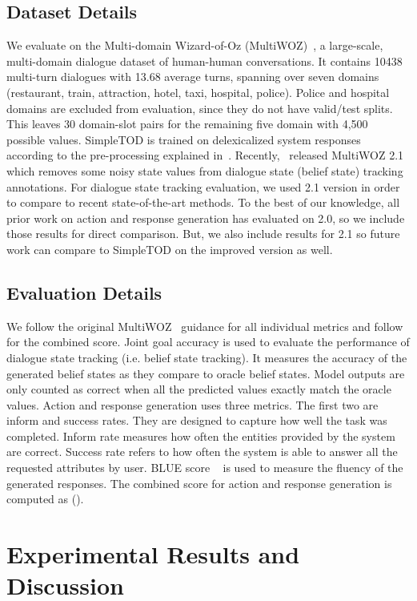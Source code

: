 \documentclass{article}
\begin{document}
\subsection{Dataset Details}
We evaluate on the Multi-domain Wizard-of-Oz (MultiWOZ)~\citep{budzianowski2018towards}, 
a large-scale, multi-domain dialogue dataset of human-human conversations. 
It contains 10438 multi-turn dialogues with 13.68 average turns, 
spanning over seven domains (restaurant, train, attraction, hotel, taxi, hospital, police). 
Police and hospital domains are excluded from evaluation, 
since they do not have valid/test splits.
This leaves 30 domain-slot pairs for the remaining five domain with 4,500 possible values.
SimpleTOD is trained on delexicalized system responses according to the pre-processing explained in~\cite{budzianowski2018towards}. 
Recently,~\cite{eric2019multiwoz} released MultiWOZ 2.1 which removes some noisy state values from dialogue state (belief state) tracking annotations.
For dialogue state tracking evaluation, 
we used 2.1 version in order to compare to recent state-of-the-art methods. 
To the best of our knowledge, 
all prior work on action and response generation has evaluated on 2.0, so we include those results for direct comparison.
But, we also include results for 2.1 so future work can compare to SimpleTOD on the improved version as well.


\subsection{Evaluation Details}
We follow the original MultiWOZ~\citep{budzianowski2018towards} guidance for all individual metrics and follow~\citet{mehri2019structured} for the combined score.
Joint goal accuracy is used to evaluate the performance of dialogue state tracking (i.e. belief state tracking).
It measures the accuracy of the generated belief states as they compare to oracle belief states.
Model outputs are only counted as correct when all the predicted values exactly match the oracle values.
Action and response generation uses three metrics.
The first two are inform and success rates.
They are designed to capture how well the task was completed. 
Inform rate measures how often the entities provided by the system are correct. 
Success rate refers to how often the system is able to answer all the requested attributes by user.
BLUE score ~\citep{papineni2002bleu} is used to measure the fluency of the generated responses. 
The combined score for action and response generation is computed as ().
 \section{Experimental Results and Discussion}
\label{sec:experimental-results}
\end{document}
